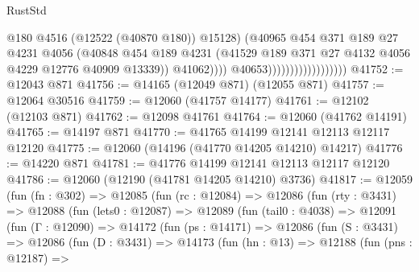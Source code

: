 \begin{lexlean}{RustStd}
\begin{coremodule}
                                                @180
                                                @4516
                                                (@12522 (@40870 @180))
                                                @15128)
                                              (@40965
                                                @454
                                                @371
                                                @189
                                                @27
                                                @4231
                                                @4056
                                                (@40848
                                                  @454
                                                  @189
                                                  @4231
                                                  (@41529
                                                    @189
                                                    @371
                                                    @27
                                                    @4132
                                                    @4056
                                                    @4229
                                                    @12776
                                                    @40909
                                                    @13339))
                                                @41062))))
                                        @40653))))))))))))))))))
@41752 := @12043 @871
@41756 := @14165 (@12049 @871) (@12055 @871)
@41757 := @12064 @30516
@41759 := @12060 (@41757 @14177)
@41761 := @12102 (@12103 @871)
@41762 := @12098 @41761
@41764 := @12060 (@41762 @14191)
@41765 := @14197 @871
@41770 := @41765 @14199 @12141 @12113 @12117 @12120
@41775 := @12060 (@14196 (@41770 @14205 @14210) @14217)
@41776 := @14220 @871
@41781 := @41776 @14199 @12141 @12113 @12117 @12120
@41786 := @12060 (@12190 (@41781 @14205 @14210) @3736)
@41817 := @12059
    (fun (fn : @302) =>
    @12085
      (fun (rc : @12084) =>
      @12086
        (fun (rty : @3431) =>
        @12088
          (fun (lets0 : @12087) =>
          @12089
            (fun (tail0 : @4038) =>
            @12091
              (fun (Γ : @12090) =>
              @14172
                (fun (ps : @14171) =>
                @12086
                  (fun (S : @3431) =>
                  @12086
                    (fun (D : @3431) =>
                    @14173
                      (fun (hn : @13) =>
                      @12188
                        (fun (pns : @12187) =>

\end{coremodule}
\end{lexlean}

